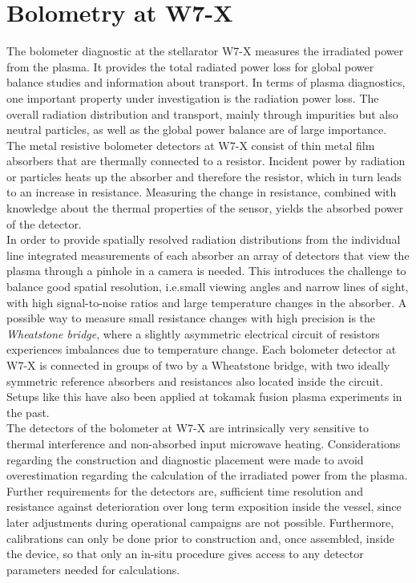     \section{Bolometry at W7-X}\label{sec:w7xbolometer}%
%
        The bolometer diagnostic at the stellarator W7-X measures the irradiated power from the plasma. It provides the total radiated power loss for global power balance studies and information about transport. In terms of plasma diagnostics, one important property under investigation is the radiation power loss. The overall radiation distribution and transport, mainly through impurities but also neutral particles, as well as the global power balance are of large importance.\\%
        The metal resistive bolometer detectors at W7-X consist of thin metal film absorbers that are thermally connected to a resistor. Incident power by radiation or particles heats up the absorber and therefore the resistor, which in turn leads to an increase in resistance. Measuring the change in resistance, combined with knowledge about the thermal properties of the sensor, yields the absorbed power of the detector.\\%
        In order to provide spatially resolved radiation distributions from the individual line integrated measurements of each absorber an array of detectors that view the plasma through a pinhole in a camera is needed. This introduces the challenge to balance good spatial resolution, i.e.small viewing angles and narrow lines of sight, with high signal-to-noise ratios and large temperature changes in the absorber. A possible way to measure small resistance changes with high precision is the \textit{Wheatstone bridge}, where a slightly asymmetric electrical circuit of resistors experiences imbalances due to temperature change\cite{Horowitz1989}. Each bolometer detector at W7-X is connected in groups of two by a Wheatstone bridge, with two ideally symmetric reference absorbers and resistances also located inside the circuit. Setups like this have also been applied at tokamak fusion plasma experiments in the past\cite{Mast1991}.\\%
        The detectors of the bolometer at W7-X are intrinsically very sensitive to thermal interference and non-absorbed input microwave heating\cite{Zhang2010}. Considerations regarding the construction and diagnostic placement were made to avoid overestimation regarding the calculation of the irradiated power from the plasma. Further requirements for the detectors are, sufficient time resolution and resistance against deterioration over long term exposition inside the vessel, since later adjustments during operational campaigns are not possible. Furthermore, calibrations can only be done prior to construction and, once assembled, inside the device, so that only an in-situ procedure gives access to any detector parameters needed for calculations.\\%
